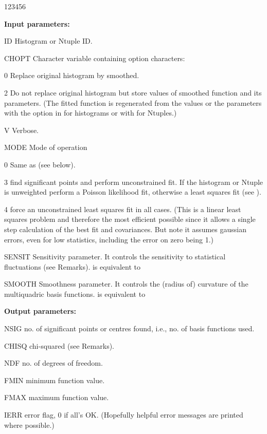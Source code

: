 \begin{DLtt}{123456}
\item[{\rm\bf Input parameters:}]
\item[ID]      Histogram or Ntuple ID.
\item[CHOPT]   Character variable containing option characters:
         \begin{DLtt}{1}
         \item[0] Replace original histogram by smoothed.
         \item[2] Do not replace original histogram but store values of smoothed
                  function and its parameters.  (The fitted function is regenerated
                  from the values or the parameters with the  option in
                   for histograms or with  for Ntuples.)
         \item[V] Verbose.
         \end{DLtt}
\item[MODE]    Mode of operation
         \begin{DLtt}{1}
         \item[0] Same as  (see below).
         \item[3] find significant points and perform unconstrained fit.  If
                  the histogram or Ntuple is unweighted perform a Poisson likelihood
                  fit, otherwise a least squares fit (see ).
         \item[4] force an unconstrained least squares fit in all cases.
                  (This is a linear least squares problem and therefore the most
                  efficient possible since it allows a single step calculation of the
                  best fit and covariances.  But note it assumes gaussian errors,
                  even for low statistics, including the error on zero being 1.)
         \end{DLtt}
\item[SENSIT]  Sensitivity parameter.  
               It controls the sensitivity to statistical fluctuations (see Remarks).
                is equivalent to 
\item[SMOOTH]  Smoothness parameter.  
               It controls the (radius of) curvature of the multiquadric basis functions.
                is equivalent to 
\item[{\rm\bf Output parameters:}]
\item[NSIG]    no. of significant points or centres found, i.e., no. of basis
               functions used.
\item[CHISQ]   chi-squared (see Remarks).
\item[NDF]     no. of degrees of freedom.
\item[FMIN]    minimum function value.
\item[FMAX]    maximum function value.
\item[IERR]    error flag, 0 if all's OK.  (Hopefully helpful error messages are
               printed where possible.)
\end{DLtt}

